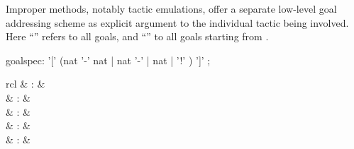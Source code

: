 \begin{isabellebody}
\begin{isamarkuptext}
  Improper methods, notably tactic emulations, offer a separate
  low-level goal addressing scheme as explicit argument to the
  individual tactic being involved.  Here ``\isa{{\isachardoublequote}{\isacharbrackleft}{\isacharbang}{\isacharbrackright}{\isachardoublequote}}'' refers to
  all goals, and ``'' to all goals starting from .

  \begin{rail}
    goalspec: '[' (nat '-' nat | nat '-' | nat | '!' ) ']'
    ;
  \end{rail}%
\end{isamarkuptext}%
\isamarkuptrue%
%
\isamarkuptrue%
%
\begin{isamarkuptext}%
\begin{matharray}{rcl}
    \hypertarget{command.proof}{\hyperlink{command.proof}{\mbox{}}} & : &  \\
    \hypertarget{command.qed}{\hyperlink{command.qed}{\mbox{}}} & : &  \\
    \hypertarget{command.by}{\hyperlink{command.by}{\mbox{}}} & : &  \\
    \hypertarget{command.ddot}{\hyperlink{command.ddot}{\mbox{\isa{\isacommand{{\isachardot}{\isachardot}}}}}} & : &  \\
    \hypertarget{command.dot}{\hyperlink{command.dot}{\mbox{\isa{\isacommand{{\isachardot}}}}}} & : &  \\

\end{matharray}
\end{isamarkuptext}
\end{isabellebody}

